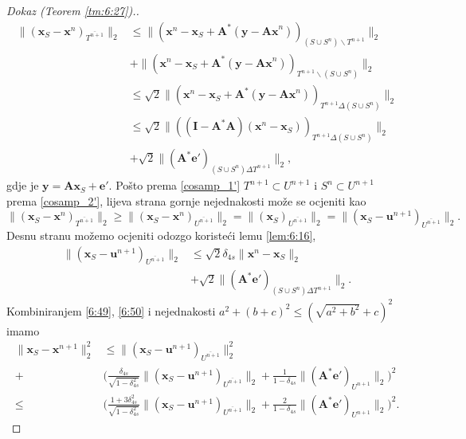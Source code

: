 \documentclass[a4paper,twoside,12pt]{memoir} %
\newcommand{\vect}[1]{\mathbf{#1}}
\renewcommand{\vec}{\vect}
\newcommand{\norm}[1]{\|{#1}\|}
\begin{document}
\begin{proof}[Dokaz (Teorem \ref{tm:6:27}).]
\begin{align*}
        \norm{(\vec x_S - \vec x^n)_{\overline{T^{n+1}}}}_2 & \leq \norm{(\vec x^n - \vec x_S + \vec A^*(\vec y - \vec{Ax}^n))_{(S \cup S^n) \backslash T^{n+1}}}_2\\[0.5em]
        & + \norm{(\vec x^n - \vec x_S + \vec A^*(\vec y - \vec{Ax}^n))_{T^{n+1} \backslash (S \cup S^n)}}_2\\[0.5em]
        & \leq \sqrt{2} \norm{(\vec x^n - \vec x_S + \vec A^*(\vec y - \vec{Ax}^n))_{T^{n+1} \Delta (S \cup S^n)}}_2\\[0.5em]
        & \leq \sqrt{2} \norm{((\vec I - \vec A^* \vec A)(\vec x^n - \vec x_S))_{T^{n+1} \Delta (S \cup S^n)}}_2\\[0.5em]
        & + \sqrt{2} \norm{(\vec A^* \vec e')_{(S \cup S^n) \Delta T^{n+1}}}_2,
    \end{align*}
    gdje je $\vec y = \vec{Ax}_S + \vec e'$. Po\v{s}to prema \eqref{cosamp_1'} $T^{n+1} \subset U^{n+1}$ i $S^n \subset U^{n+1}$ prema \eqref{cosamp_2'}, lijeva strana gornje nejednakosti mo\v{z}e se ocjeniti kao
    \begin{equation*}
        \norm{(\vec x_S - \vec x^n)_{\overline{T^{n+1}}}}_2 \geq \norm{(\vec x_S - \vec x^n)_{\overline{U^{n+1}}}}_2 = \norm{(\vec x_S)_{\overline{U^{n+1}}}}_2 = \norm{(\vec x_S - \vec u^{n+1})_{\overline{U^{n+1}}}}_2.
    \end{equation*}
    Desnu stranu mo\v{z}emo ocjeniti odozgo koriste\'ci lemu \ref{lem:6:16},
    \begin{align}
        \norm{(\vec x_S - \vec u^{n+1})_{\overline{U^{n+1}}}}_2 & \leq \sqrt{2} \delta_{4s} \norm{\vec x^n - \vec x_S}_2 \nonumber \\[0.5em]
            & + \sqrt{2}\norm{(\vec A^*\vec e')_{(S \cup S^n) \Delta T^{n+1}}}_2.\label{6:51}
    \end{align}
    Kombiniranjem \eqref{6:49}, \eqref{6:50} i nejednakosti $a^2 + (b+c)^2 \leq (\sqrt{a^2 + b^2} + c)^2$ imamo
    \begin{align*}
        \norm{\vec x_S - \vec x^{n+1}}_2^2 & \leq \norm{(\vec x_S - \vec u^{n+1})_{\overline{U^{n+1}}}}_2^2\\[0.5em]
        + & \bigg( \frac{\delta_{4s}}{\sqrt{1-\delta_{4s}^2}}\norm{(\vec x_S - \vec u^{n+1})_{\overline{U^{n+1}}}}_2 + \frac{1}{1-\delta_{4s}} \norm{(\vec A^* \vec e')_{U^{n+1}}}_2   \bigg)^2\\[0.5em]
        \leq & \bigg( \frac{1+3 \delta_{4s}^2}{\sqrt{1-\delta_{4s}^2}}\norm{(\vec x_S - \vec u^{n+1})_{\overline{U^{n+1}}}}_2 + \frac{2}{1-\delta_{4s}} \norm{(\vec A^* \vec e')_{U^{n+1}}}_2   \bigg)^2.

\end{align*}
\end{proof}
\end{document}
